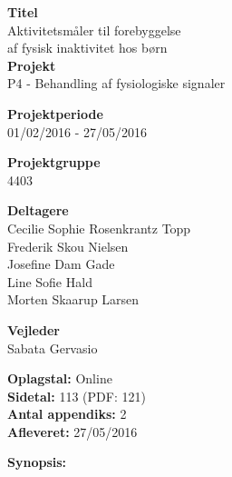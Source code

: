 \begin{minipage}[t]{0.48\textwidth}
\textbf{Titel} \\[5pt]\hspace*{2ex} 
Aktivitetsmåler til forebyggelse\\\hspace*{2ex}
af fysisk inaktivitet hos børn\\


\textbf{Projekt} \\[5pt]\hspace*{2ex} 
P4 - Behandling af fysiologiske signaler\\\hspace*{2ex}


\textbf{Projektperiode} \\[5pt]\bigskip\hspace{2ex}
01/02/2016 - 27/05/2016

\textbf{Projektgruppe} \\[5pt]\bigskip\hspace{2ex}
4403

\textbf{Deltagere} \\[5pt]\hspace*{2ex}
Cecilie Sophie Rosenkrantz Topp \\\hspace*{2ex}
Frederik Skou Nielsen \\\hspace*{2ex}
Josefine Dam Gade \\\hspace*{2ex}
Line Sofie Hald \\\hspace*{2ex}
Morten Skaarup Larsen \\\bigskip\hspace{2ex}


\textbf{Vejleder} \\[5pt]\hspace*{2ex}
Sabata Gervasio \\\bigskip\hspace{2ex}


\vspace*{1cm}

\textbf{Oplagstal:} Online \\
\textbf{Sidetal:} 113 (PDF: 121) \\
\textbf{Antal appendiks:} 2 \\ 
\textbf{Afleveret:} 27/05/2016

\end{minipage}
\hfill
\begin{minipage}[t]{0.483\textwidth}
\textbf{Synopsis:} \\[5pt]
\fbox{\parbox{7.5cm}{\bigskip\bigskip}}
\end{minipage}

